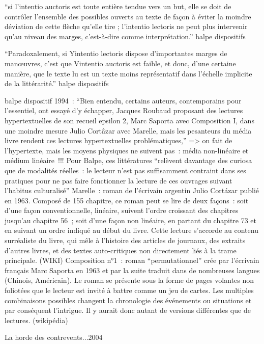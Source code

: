 \documentclass{article}
\begin{document}
				``si l'intentio auctoris est toute entière tendue vers un but, elle se doit de contrôler l'ensemble des possibles ouverts au texte de façon à éviter la moindre déviation de cette flèche qu'elle tire ; l'intentio lectoris ne peut plus intervenir qu'au niveau des marges, c'est-à-dire comme interprétation.'' balpe dispositifs
				
				``Paradoxalement, si Yintentio lectoris dispose d'importantes marges de manœuvres, c'est que
				Vintentio auctoris est faible, et donc, d'une certaine manière, que le texte lu est un texte moins représentatif dans l'échelle implicite de la littérarité.'' balpe dispositifs
				
				balpe dispositif 1994 : ``Bien entendu, certains auteurs, contemporains pour l'essentiel, ont essayé d'y échapper, Jacques Roubaud proposant des lectures hypertextuelles de son recueil epsilon 2, Marc Saporta avec Composition I, dans une moindre mesure Julio Cortâzar avec Marelle, mais les pesanteurs du média livre rendent ces lectures hypertextuelles problématiques,''
				=> on fait de l'hypertexte, mais les moyens physiques ne suivent pas : média non-linéaire et médium linéaire !!!
				Pour Balpe, ces littératures ``relèvent davantage des curiosa que de modalités réelles~: le lecteur n'est pas suffisamment contraint dans ses pratiques pour ne pas faire fonctionner la lecture de ces ouvrages
				suivant l'habitus culturalisé''
				Marelle : roman de l'écrivain argentin Julio Cortázar publié en 1963. Composé de 155 chapitre, ce roman peut se lire de deux façons : soit d'une façon conventionnelle, linéaire, suivent l'ordre croissant des chapitres jusqu'au chapitre 56 ; soit d'une façon non linéaire, en partant du chapitre 73 et en suivant un ordre indiqué au début du livre. Cette lecture s'accorde au contenu surréaliste du livre, qui mêle à l'histoire des articles de journaux, des extraits d'autres livres, et des textes auto-critiques non directement liés à la trame principale. (WIKI)
				Composition n°1 : roman ``permutationnel'' crée par l'écrivain français Marc Saporta en 1963 et par la suite traduit dans de nombreuses langues (Chinois, Américain). Le roman se présente sous la forme de pages volantes non foliotées que le lecteur est invité à battre comme un jeu de cartes. Les multiples combinaisons possibles changent la chronologie des événements ou situations et par conséquent l'intrigue. Il y aurait donc autant de versions différentes que de lectures. (wikipédia)
				
				
				La horde des contrevents...2004
				
\end{document}
